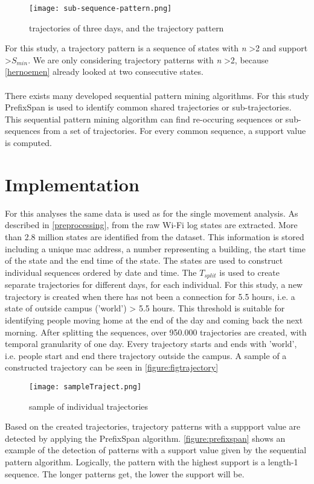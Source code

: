 \begin{figure}[H]
\centering
\texttt{[image: sub-sequence-pattern.png]}
\captionsetup{justification=centering}
\caption{trajectories of three days, and the trajectory pattern}
\label{figure:figseqpattern}
\end{figure}
For this study, a trajectory pattern is a sequence of states with \textit{n} \textgreater 2 and support \textgreater \textit{$S_{min}$}. We are only considering trajectory patterns with \textit{n} \textgreater 2, because \autoref{hernoemen} already looked at two consecutive states.\\\\
There exists many developed sequential pattern mining algorithms. For this study PrefixSpan \cite{pei2004mining} is used to identify common shared trajectories or sub-trajectories. This sequential pattern mining algorithm can find re-occuring sequences or sub-sequences from a set of trajectories. For every common sequence, a support value is computed. 
\section{Implementation}
For this analyses the same data is used as for the single movement analysis. As described in \autoref{preprocessing}, from the raw Wi-Fi log states are extracted. More than 2.8 million states are identified from the dataset. This information is stored including a unique mac address, a number representing a building, the start time of the state and the end time of the state. The states are used to construct individual sequences ordered by date and time. The \textit{$T_{split}$} is used to create separate trajectories for different days, for each individual. For this study, a new trajectory is created when there has not been a connection for 5.5 hours, i.e. a state of outside campus ('world') > 5.5 hours. This threshold is suitable for identifying people moving home at the end of the day and coming back the next morning. After splitting the sequences, over 950.000 trajectories are created, with temporal granularity of one day. Every trajectory starts and ends with 'world', i.e. people start and end there trajectory outside the campus. A sample of a constructed trajectory can be seen in \autoref{figure:figtrajectory}

\begin{figure}[H]
\centering
\texttt{[image: sampleTraject.png]}
\captionsetup{justification=centering}
\caption{sample of individual trajectories}
\label{figure:figtrajectory}
\end{figure}
Based on the created trajectories, trajectory patterns with a suppport value are detected by applying the PrefixSpan algorithm. \autoref{figure:prefixspan} shows an example of the detection of patterns with a support value given by the sequential pattern algorithm. Logically, the pattern with the highest support is a length-1 sequence. The longer patterns get, the lower the support will be.  

